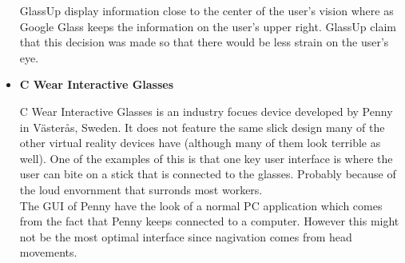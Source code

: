 \begin{itemize}
GlassUp display information close to the center of the user's vision where as Google Glass keeps the information on the user's upper right. GlassUp claim that this decision was made so that there would be less strain on the user's eye.

\item \textbf{C Wear Interactive Glasses}\cite{penny}

C Wear Interactive Glasses is an industry focues device developed by Penny in V{\"a}ster{\aa}s, Sweden. It does not feature the same slick design many of the other virtual reality devices have (although many of them look terrible as well). One of the examples of this is that one key user interface is where the user can bite on a stick that is connected to the glasses. Probably because of the loud envornment that surronds most workers.\\

The GUI of Penny have the look of a normal PC application which comes from the fact that Penny keeps connected to a computer. However this might not be the most optimal interface since nagivation comes from head movements.
\end{itemize}

